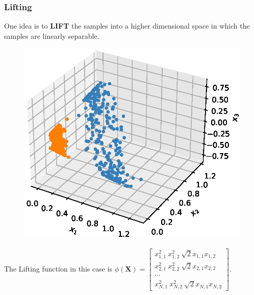 \documentclass[10pt]{../formats/RU}
\begin{document}
\begin{frame}
  \frametitle{Lifting}
  One idea is to \textbf{LIFT} the samples into a higher dimensional space in which the samples are linearly separable.
  \begin{figure}
    \includegraphics[height=0.45\textheight]{./figs/3d_poly_circle.eps}%
  \end{figure}
  The Lifting function in this case is
  $
  \phi(\mathbf{X}) = {
    \begin{bmatrix}
      x_{1,1}^2 \ x_{1,2}^2 \ \sqrt{2}x_{1,1}x_{1,2} \\
      x_{2,1}^2 \ x_{2,2}^2 \ \sqrt{2}x_{2,1}x_{2,2} \\
      \cdots \\
      x_{N,1}^2 \ x_{N,2}^2 \ \sqrt{2}x_{N,1}x_{N,2}
    \end{bmatrix}
  }
  $.
\end{frame}
\end{document}
